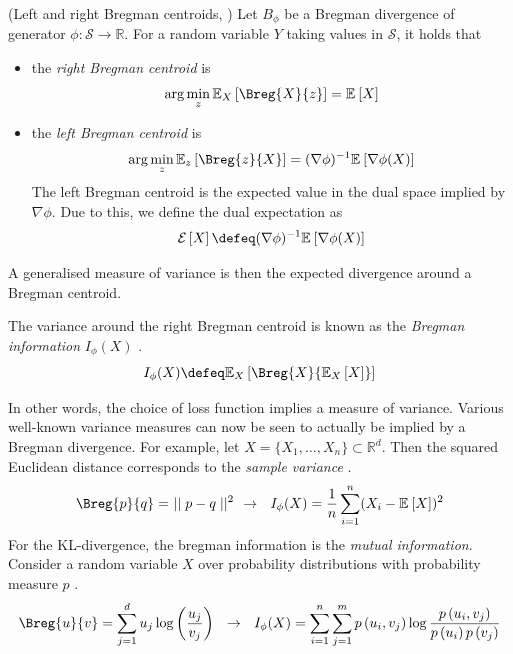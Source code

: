 \documentclass[
    a4paper, %
	fontsize=10pt, %
	twoside=false, %
]{kaobook}
\begin{document}
\begin{titlepage}
\begin{lemma} (Left and right Bregman centroids, \cite{pfau_GeneralizedBiasVarianceDecomposition_})
    Let $B_{\phi}$ be a Bregman divergence of generator $\phi: \mathcal{S} \to \mathbb{R}$. For a random variable $Y$ taking values in $\mathcal{S}$, it holds that
\begin{itemize}
    \item the \textit{right Bregman centroid} is $$\arg \min_z \mathbb{E}_{X}\left[ \Breg{X}{z}  \right] = \mathbb{E}_{}\left[ X \right]$$
    \item the \textit{left Bregman centroid} is $$\arg\min_{z}  \mathbb{E}_{z}\left[ \Breg{z}{X}\right] = (\nabla \phi)^{-1} \mathbb{E}_{}\left[ \nabla \phi(X) \right]$$
  The left Bregman centroid is the expected value in the dual space implied by $\nabla\phi$. Due to this, we define the dual expectation as  
  $$\mathcal{E}\left[X\right] \defeq (\nabla \phi)^{-1}\mathbb{E}_{}\left[ \nabla \phi(X) \right]$$ 
\end{itemize}
\end{lemma}


A generalised measure of variance is then the expected divergence around a Bregman centroid.

\begin{definition}
	\label{def:bregman-information}
	The variance around the right Bregman centroid is known as the 
	\textit{Bregman information} 
  $I_{\phi}(X)$
  \cite{banerjee_ClusteringBregmanDivergences_2004}.
$$
I_{\phi}(X) \defeq \mathbb{E}_{X}\left[ \Breg{X}{\mathbb{E}_X\left[ X \right] } \right] 
$$
\end{definition}

In other words, the choice of loss function implies a measure of variance. Various well-known variance measures can now be seen to actually be implied by a Bregman divergence.
For example, let $X = \{ X_{1}, \dots, X_{n} \} \subset \mathbb{R}^d$. Then the squared Euclidean distance corresponds to the \textit{sample variance} \cite{banerjee_ClusteringBregmanDivergences_2004}.
$$
\Breg{p}{q} =~\mid\mid p-q\mid\mid^2 ~ ~ \rightarrow ~ ~ 
I_{\phi}(X) = \frac{1}{n} \sum_{i=1}^n (X_{i} - \mathbb{E}_{}\left[ X \right] )^2
$$
For the KL-divergence, the bregman information is the \textit{mutual information}. Consider a random variable $X$ over probability distributions with probability measure $p$ \cite{banerjee_ClusteringBregmanDivergences_2004}.
$$
\Breg{u}{v} = \sum_{j=1}^d u_{j} \log \left( \frac{u_{j}}{v_{j}} \right) 
~ ~ \rightarrow ~ ~  I_{\phi}(X) = 
\sum_{i=1}^n \sum_{j=1}^m p\left(u_i, v_j\right) \log \frac{p\left(u_i, v_j\right)}{p\left(u_i\right) p\left(v_j\right)}
$$


\end{titlepage}
\end{document}
